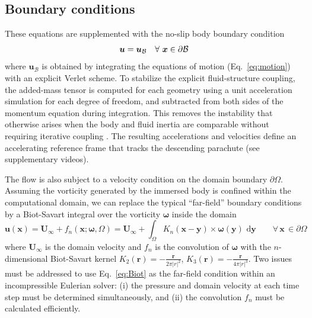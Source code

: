 \documentclass[lineno]{JFM-FLM_Au}
\begin{document}
\subsection{Boundary conditions}
These equations are supplemented with the no-slip body boundary condition
\begin{equation}
    \bm{u} = \bm{u}_\mathcal{B} \quad \forall\ \bm{x} \in \partial\cal{B}
\end{equation} 
where $\bm{u}_\mathcal{B}$ is obtained by integrating the 
equations of motion (Eq.~\ref{eq:motion}) with an explicit Verlet scheme. 
To stabilize the explicit fluid-structure coupling, the added-mass tensor is computed for each geometry using a unit acceleration simulation for each degree of freedom, and subtracted from both sides of the momentum equation during integration. This removes the instability that otherwise arises when the body and fluid inertia are comparable without requiring iterative coupling \citep{Weymouth2014ChaoticCylinder}. The resulting accelerations and velocities define an accelerating reference frame that tracks the descending parachute 
(see supplementary videos).

The flow is also subject to a velocity condition on the domain boundary $\partial\Omega$. 
Assuming the vorticity generated by the immersed body is confined within the computational domain, we can replace the typical ``far-field'' boundary conditions by a Biot-Savart integral over the vorticity $\bm \omega$ inside the domain
\begin{equation}\label{eq:Biot}
    {\bm u}({\bm x}) = \bm U_\infty+f_n(\bm x; \bm\omega,\Omega) = \bm U_\infty+\int_\Omega K_{n}({\bm x} - \bm{y})\times \bm\omega({\bm y})\text{ d}\bm{y} \quad\quad \forall\, \bm x\, \in \partial\Omega
\end{equation}
where $\bm U_\infty$ is the domain velocity and $f_n$ is the convolution of $\bm\omega$ with the $n$-dimensional Biot-Savart kernel $K_2(\bm r)= -\frac{\bm r}{2\pi|r|^2}$, $K_3(\bm r)= -\frac{\bm r}{4\pi|r|^3}$.
Two issues must be addressed to use Eq.~\ref{eq:Biot} as the far-field condition within an incompressible Eulerian solver: (i) the pressure and domain velocity at each time step must be determined simultaneously, and (ii) the convolution $f_n$ must be calculated efficiently.
\end{document}
